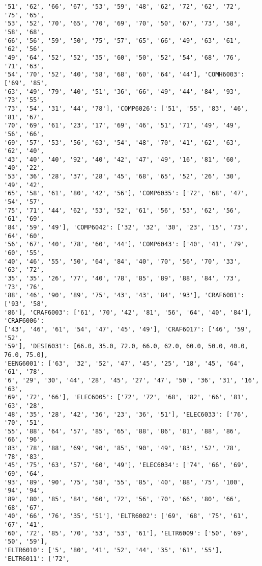 \documentclass[11pt]{article}
\begin{document}
\begin{Verbatim}[commandchars=\\\{\}]
'51', '62', '66', '67', '53', '59', '48', '62', '72', '62', '72', '75', '65',
'53', '52', '70', '65', '70', '69', '70', '50', '67', '73', '58', '58', '68',
'66', '56', '59', '50', '75', '57', '65', '66', '49', '63', '61', '62', '56',
'49', '64', '52', '52', '35', '60', '50', '52', '54', '68', '76', '71', '63',
'54', '70', '52', '40', '58', '68', '60', '64', '44'], 'COMH6003': ['69', '85',
'63', '49', '79', '40', '51', '36', '66', '49', '44', '84', '93', '73', '55',
'73', '54', '31', '44', '78'], 'COMP6026': ['51', '55', '83', '46', '81', '67',
'70', '69', '61', '23', '17', '69', '46', '51', '71', '49', '49', '56', '66',
'69', '57', '53', '56', '63', '54', '48', '70', '41', '62', '63', '62', '40',
'43', '40', '40', '92', '40', '42', '47', '49', '16', '81', '60', '40', '22',
'53', '36', '28', '37', '28', '45', '68', '65', '52', '26', '30', '49', '42',
'65', '58', '61', '80', '42', '56'], 'COMP6035': ['72', '68', '47', '54', '57',
'75', '71', '44', '62', '53', '52', '61', '56', '53', '62', '56', '61', '69',
'84', '59', '49'], 'COMP6042': ['32', '32', '30', '23', '15', '73', '64', '60',
'56', '67', '40', '78', '60', '44'], 'COMP6043': ['40', '41', '79', '60', '55',
'40', '46', '55', '50', '64', '84', '40', '70', '56', '70', '33', '63', '72',
'35', '35', '26', '77', '40', '78', '85', '89', '88', '84', '73', '73', '76',
'88', '46', '90', '89', '75', '43', '43', '84', '93'], 'CRAF6001': ['93', '58',
'86'], 'CRAF6003': ['61', '70', '42', '81', '56', '64', '40', '84'], 'CRAF6006':
['43', '46', '61', '54', '47', '45', '49'], 'CRAF6017': ['46', '59', '52',
'59'], 'DESI6031': [66.0, 35.0, 72.0, 66.0, 62.0, 60.0, 50.0, 40.0, 76.0, 75.0],
'EENG6001': ['63', '32', '52', '47', '45', '25', '18', '45', '64', '61', '78',
'6', '29', '30', '44', '28', '45', '27', '47', '50', '36', '31', '16', '63',
'69', '72', '66'], 'ELEC6005': ['72', '72', '68', '82', '66', '81', '63', '28',
'48', '35', '28', '42', '36', '23', '36', '51'], 'ELEC6033': ['76', '70', '51',
'55', '88', '64', '57', '85', '65', '88', '86', '81', '88', '86', '66', '96',
'83', '78', '88', '69', '90', '85', '90', '49', '83', '52', '78', '78', '83',
'45', '75', '63', '57', '60', '49'], 'ELEC6034': ['74', '66', '69', '69', '64',
'93', '89', '90', '75', '58', '55', '85', '40', '88', '75', '100', '94', '94',
'89', '80', '85', '84', '60', '72', '56', '70', '66', '80', '66', '68', '67',
'40', '66', '76', '35', '51'], 'ELTR6002': ['69', '68', '75', '61', '67', '41',
'60', '72', '85', '70', '53', '53', '61'], 'ELTR6009': ['50', '69', '50', '59'],
'ELTR6010': ['5', '80', '41', '52', '44', '35', '61', '55'], 'ELTR6011': ['72',

\end{Verbatim}
\end{document}
